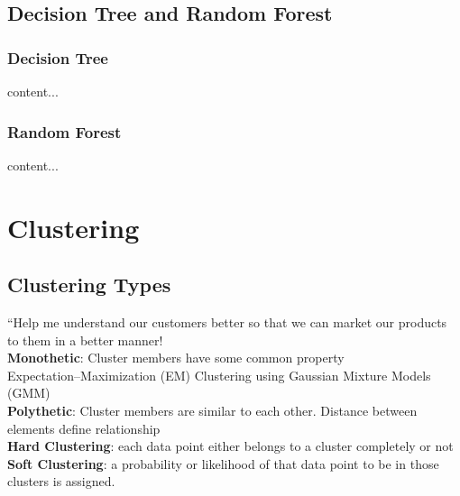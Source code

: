 \documentclass{beamer}
\begin{document}
\subsection{Decision Tree and Random Forest}
\begin{frame}\frametitle{Decision Tree}
	content...
\end{frame}

\begin{frame}\frametitle{Random Forest}
content...
\end{frame}



\section{Clustering}
\subsection{Clustering Types}
\begin{frame}
	“Help me understand our customers better so that we can market our products to them in a better manner!\\
	\textbf{Monothetic}: Cluster members have some common property\\
	Expectation–Maximization (EM) Clustering using Gaussian Mixture Models (GMM)\\
	\textbf{Polythetic}: Cluster members are similar to each other. Distance between elements define relationship\\
	\textbf{Hard Clustering}: each data point either belongs to a cluster completely or not\\
	\textbf{Soft Clustering}: a probability or likelihood of that data point to be in those clusters is assigned.
\end{frame}

\begingroup
\tiny
\end{document}
